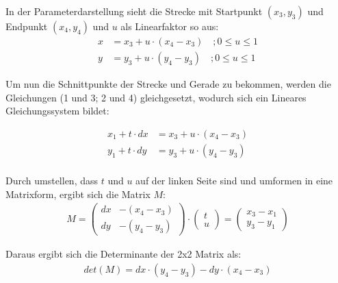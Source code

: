 \documentclass[a4paper,10pt,ngerman]{scrartcl}
\begin{document}
\begin{itemize}
  In der Parameterdarstellung sieht die Strecke mit Startpunkt $(x_{3}, y_{3})$ und Endpunkt $(x_{4}, y_{4})$ und $u$ als Linearfaktor so aus:
  \begin{align}
    x&=x_{3} + u \cdot (x_{4} - x_{3}) \quad; 0 \leq u \leq 1 \\
    y&=y_{3} + u \cdot (y_{4} - y_{3}) \quad; 0 \leq u \leq 1
  \end{align}

  Um nun die Schnittpunkte der Strecke und Gerade zu bekommen, werden die Gleichungen (1 und 3; 2 und 4) gleichgesetzt, wodurch sich ein Lineares Gleichungssystem bildet:

  \begin{align*}
    x_{1}+t\cdot dx&=x_{3}+u \cdot (x_{4} - x_{3}) \\
    y_{1}+t \cdot dy&=y_{3}+u\cdot (y_{4} - y_{3}) \\
  \end{align*}

  Durch umstellen, dass $t$ und $u$ auf der linken Seite sind und umformen in eine Matrixform, ergibt sich die Matrix $M$:
  \begin{align}
    M = 
    \begin{pmatrix}
      dx & -(x_{4} - x_{3})\\
      dy & -(y_{4} - y_{3})
    \end{pmatrix}
    \cdot
    \begin{pmatrix}
      t \\
      u
    \end{pmatrix}
    =
    \begin{pmatrix}
      x_{3} - x_{1} \\
      y_{3} - y_{1}
    \end{pmatrix}
  \end{align}

  Daraus ergibt sich die Determinante der 2x2 Matrix als:
  \begin{align*}
    det(M) = dx \cdot (y_{4} - y_{3}) - dy \cdot (x_{4} - x_{3})
  \end{align*}


\end{itemize}
\end{document}
